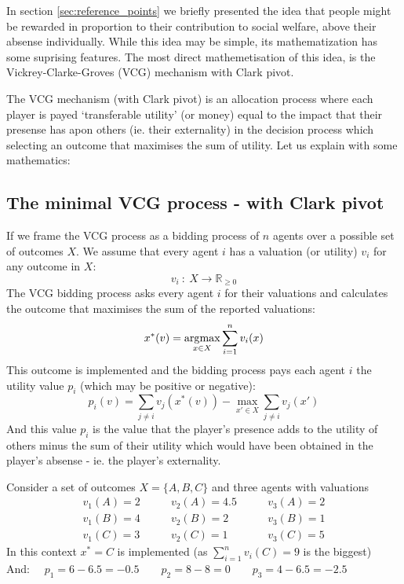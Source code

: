 In section \ref{sec:reference_points} we briefly presented the idea that people might be rewarded in proportion to their contribution to social welfare, above their absense individually.
While this idea may be simple, its mathematization has some suprising features.
The most direct mathemetisation of this idea, is the Vickrey-Clarke-Groves (VCG) mechanism with Clark pivot.

The VCG mechanism (with Clark pivot) is an allocation process where each player is payed `transferable utility' (or money) equal to the impact that their presense has apon others (ie. their externality) in the decision process which selecting an outcome that maximises the sum of utility.
Let us explain with some mathematics:

\subsection{The minimal VCG process - with Clark pivot}
If we frame the VCG process as a bidding process of $n$ agents over a possible set of outcomes $X$.
We assume that every agent $i$ has a valuation (or utility) $v_i$ for any outcome in $X$:
$$ v_i~:~X\rightarrow \mathbb{R}_{\ge 0} $$
The VCG bidding process asks every agent $i$ for their valuations and calculates the outcome that maximises the sum of the reported valuations:
$$ x^*(v) = \operatorname*{\arg\!\max}_{x\in X}\sum_{i=1}^{n}v_i(x) $$
This outcome is implemented and the bidding process pays each agent $i$ the utility value $p_i$ (which may be positive or negative):
\begin{equation}\label{eq:VCG_payment_rule} p_i(v)=\sum_{j\ne i}v_j(x^*(v)) - \max_{x'\in X}\sum_{j\ne i}v_j(x') \end{equation}
And this value $p_i$ is the value that the player's presence adds to the utility of others minus the sum of their utility which would have been obtained in the player's absense - ie. the player's externality.

\begin{example}
Consider a set of outcomes $X = \{A,B,C\}$ and three agents with valuations 
$$\begin{matrix}v_1(A) = 2\\v_1(B) = 4\\v_1(C) = 3\end{matrix}\quad\quad
\begin{matrix}v_2(A) = 4.5\\v_2(B) = 2\\v_2(C) = 1\end{matrix}\quad\quad
\begin{matrix}v_3(A) = 2\\v_3(B) = 1\\v_3(C) = 5\end{matrix}$$
In this context $x^* = C$ is implemented (as $\sum_{i=1}^nv_i(C)=9$ is the biggest)\\And:
$\quad p_1 = 6-6.5 = -0.5 \quad\quad p_2 = 8-8 = 0\quad\quad p_3 = 4-6.5 = -2.5 $
\end{example}

